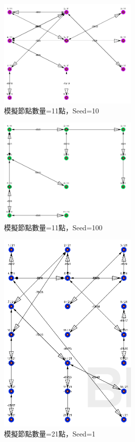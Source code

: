 \begin{ZhChapter}
\begin{figure}[H]
    \centering
    \includegraphics[width = 0.6\textwidth]{image/模擬實驗11點seed=10.png}
    \caption{模擬節點數量=11點，Seed=10}
    \label{fig: 模擬實驗11點seed=10}
\end{figure}

\begin{figure}[H]
    \centering
    \includegraphics[width = 0.6\textwidth]{image/模擬實驗11點seed=100.png}
    \caption{模擬節點數量=11點，Seed=100}
    \label{fig: 模擬實驗11點seed=100}
\end{figure}

\begin{figure}[H]
    \centering
    \includegraphics[width = 0.6\textwidth]{image/模擬實驗21點seed=1.png}
    \caption{模擬節點數量=21點，Seed=1}
    \label{fig: 模擬實驗21點seed=1}
\end{figure}


\end{ZhChapter}
